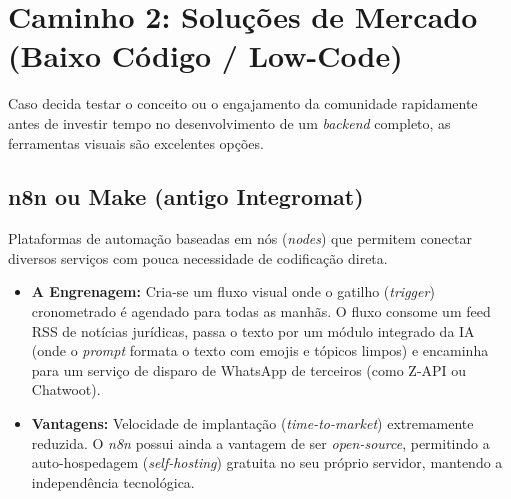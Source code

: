 \documentclass[11pt,a4paper]{article}
\begin{document}
\section{Caminho 2: Soluções de Mercado (Baixo Código / Low-Code)}
Caso decida testar o conceito ou o engajamento da comunidade rapidamente antes de investir tempo no desenvolvimento de um \textit{backend} completo, as ferramentas visuais são excelentes opções.

\subsection{n8n ou Make (antigo Integromat)}
Plataformas de automação baseadas em nós (\textit{nodes}) que permitem conectar diversos serviços com pouca necessidade de codificação direta.
\begin{itemize}[label=\textbullet]
    \item \textbf{A Engrenagem:} Cria-se um fluxo visual onde o gatilho (\textit{trigger}) cronometrado é agendado para todas as manhãs. O fluxo consome um feed RSS de notícias jurídicas, passa o texto por um módulo integrado da IA (onde o \textit{prompt} formata o texto com emojis e tópicos limpos) e encaminha para um serviço de disparo de WhatsApp de terceiros (como Z-API ou Chatwoot).
    \item \textbf{Vantagens:} Velocidade de implantação (\textit{time-to-market}) extremamente reduzida. O \textit{n8n} possui ainda a vantagem de ser \textit{open-source}, permitindo a auto-hospedagem (\textit{self-hosting}) gratuita no seu próprio servidor, mantendo a independência tecnológica.
\end{itemize}
\end{document}
